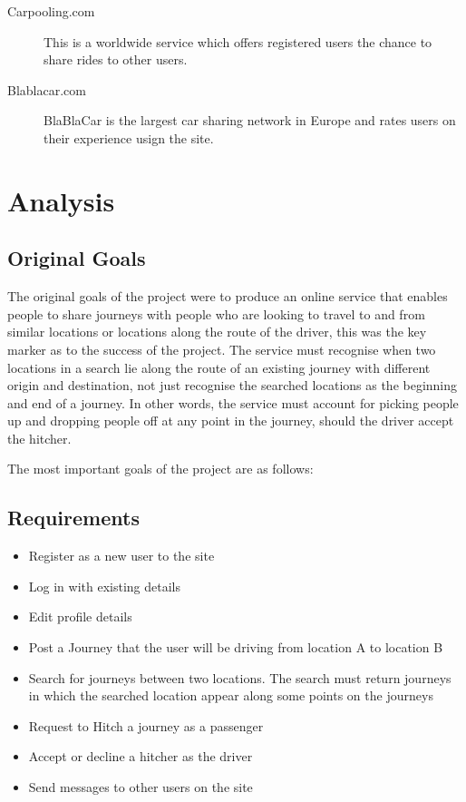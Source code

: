 	\begin{description}
	\item[Carpooling.com] This is a worldwide service which offers registered users the chance to share rides to other users.
	\item[Blablacar.com] BlaBlaCar is the largest car sharing network in Europe and rates users on their experience usign the site.
	\end{description}
	

\section{Analysis}

\subsection{Original Goals}
	The original goals of the project were to produce an online service that enables people to share journeys with people who are looking to travel to and from similar locations or locations along the route of the driver, this was the key marker as to the success of the project. The service must recognise when two locations in a search lie along the route of an existing journey with different origin and destination, not just recognise the searched locations as the beginning and end of a journey. In other words, the service must account for picking people up and dropping people off at any point in the journey, should the driver accept the hitcher.

The most important goals of the project are as follows:
	
\subsection{Requirements}
\begin{itemize}
\item Register as a new user to the site
\item Log in with existing details
\item Edit profile details
\item Post a Journey that the user will be driving from location A to location B
\item Search for journeys between two locations. The search must return journeys in which the searched location appear along some points on the journeys
\item Request to Hitch a journey as a passenger
\item Accept or decline a hitcher as the driver
\item Send messages to other users on the site
\end{itemize}

